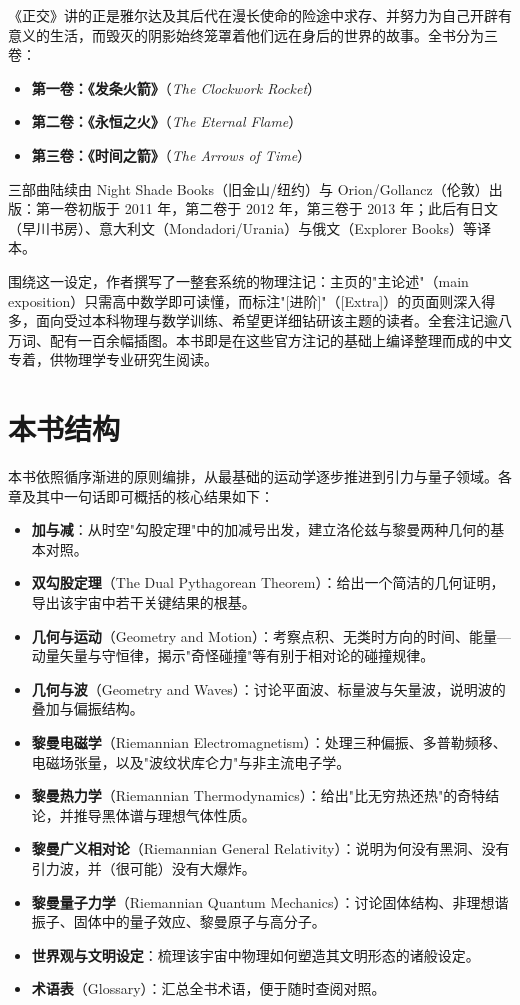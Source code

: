 《正交》讲的正是雅尔达及其后代在漫长使命的险途中求存、并努力为自己开辟有意义的生活，而毁灭的阴影始终笼罩着他们远在身后的世界的故事。全书分为三卷：

\begin{itemize}
  \item \textbf{第一卷：《发条火箭》}（\emph{The Clockwork Rocket}）
  \item \textbf{第二卷：《永恒之火》}（\emph{The Eternal Flame}）
  \item \textbf{第三卷：《时间之箭》}（\emph{The Arrows of Time}）
\end{itemize}

三部曲陆续由 Night Shade Books（旧金山/纽约）与 Orion/Gollancz（伦敦）出版：第一卷初版于 2011 年，第二卷于 2012 年，第三卷于 2013 年；此后有日文（早川书房）、意大利文（Mondadori/Urania）与俄文（Explorer Books）等译本。

围绕这一设定，作者撰写了一整套系统的物理注记：主页的"主论述"（main exposition）只需高中数学即可读懂，而标注"[进阶]"（[Extra]）的页面则深入得多，面向受过本科物理与数学训练、希望更详细钻研该主题的读者。全套注记逾八万词、配有一百余幅插图。本书即是在这些官方注记的基础上编译整理而成的中文专着，供物理学专业研究生阅读。

\section{本书结构}

本书依照循序渐进的原则编排，从最基础的运动学逐步推进到引力与量子领域。各章及其中一句话即可概括的核心结果如下：

\begin{itemize}
  \item \textbf{加与减}：从时空"勾股定理"中的加减号出发，建立洛伦兹与黎曼两种几何的基本对照。
  \item \textbf{双勾股定理}（The Dual Pythagorean Theorem）：给出一个简洁的几何证明，导出该宇宙中若干关键结果的根基。
  \item \textbf{几何与运动}（Geometry and Motion）：考察点积、无类时方向的时间、能量—动量矢量与守恒律，揭示"奇怪碰撞"等有别于相对论的碰撞规律。
  \item \textbf{几何与波}（Geometry and Waves）：讨论平面波、标量波与矢量波，说明波的叠加与偏振结构。
  \item \textbf{黎曼电磁学}（Riemannian Electromagnetism）：处理三种偏振、多普勒频移、电磁场张量，以及"波纹状库仑力"与非主流电子学。
  \item \textbf{黎曼热力学}（Riemannian Thermodynamics）：给出"比无穷热还热"的奇特结论，并推导黑体谱与理想气体性质。
  \item \textbf{黎曼广义相对论}（Riemannian General Relativity）：说明为何没有黑洞、没有引力波，并（很可能）没有大爆炸。
  \item \textbf{黎曼量子力学}（Riemannian Quantum Mechanics）：讨论固体结构、非理想谐振子、固体中的量子效应、黎曼原子与高分子。
  \item \textbf{世界观与文明设定}：梳理该宇宙中物理如何塑造其文明形态的诸般设定。
  \item \textbf{术语表}（Glossary）：汇总全书术语，便于随时查阅对照。
\end{itemize}

